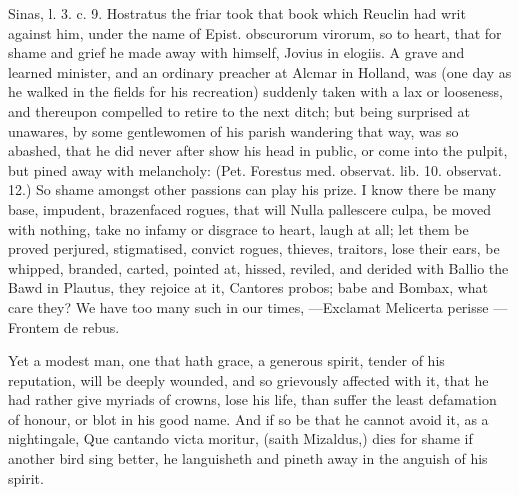 {Sinas, l. 3. c. 9. Hostratus the friar took that book which Reuclin had
writ against him, under the name of Epist. obscurorum virorum, so to
heart, that for shame and grief he made away with himself, Jovius
in elogiis. A grave and learned minister, and an ordinary preacher at
Alcmar in Holland, was (one day as he walked in the fields for his
recreation) suddenly taken with a lax or looseness, and thereupon
compelled to retire to the next ditch; but being surprised at
unawares, by some gentlewomen of his parish wandering that way, was so
abashed, that he did never after show his head in public, or come into
the pulpit, but pined away with melancholy: (Pet. Forestus med.
observat. lib. 10. observat. 12.) So shame amongst other passions can
play his prize.
I know there be many base, impudent, brazenfaced rogues, that will
 Nulla pallescere culpa, be moved with nothing, take no infamy or
disgrace to heart, laugh at all; let them be proved perjured,
stigmatised, convict rogues, thieves, traitors, lose their ears, be
whipped, branded, carted, pointed at, hissed, reviled, and derided with
Ballio the Bawd in Plautus, they rejoice at it, Cantores probos;
babe and Bombax, what care they? We have too many such in our times,
---Exclamat Melicerta perisse
---Frontem de rebus.

Yet a modest man, one that hath grace, a generous spirit, tender of his
reputation, will be deeply wounded, and so grievously affected with it,
that he had rather give myriads of crowns, lose his life, than suffer
the least defamation of honour, or blot in his good name. And if so be
that he cannot avoid it, as a nightingale, Que cantando victa moritur,
(saith Mizaldus,) dies for shame if another bird sing better, he
languisheth and pineth away in the anguish of his spirit.

}
